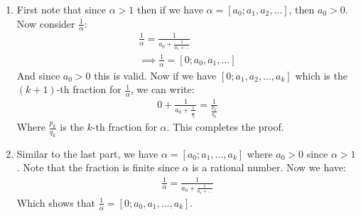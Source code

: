 \begin{enumerate}[label=\ilabel]
    \item 
        First note that since $\alpha > 1$ then if we have $\alpha = [a_0; a_1, a_2, \dots]$, then $a_0 > 0$. Now consider $\frac{1}{\alpha}$:
        \begin{gather*}
            \frac{1}{\alpha} = \frac{1}{a_0 + \frac{1}{a_1 + \dots}} \\
            \implies \frac{1}{\alpha} = [0; a_0, a_1, \dots]
        \end{gather*}
        And since $a_0 > 0$ this is valid. Now if we have $[0; a_1, a_2, \dots, a_k]$ which is the $(k + 1)$-th fraction for $\frac{1}{\alpha}$, we can write:
        \begin{gather*}
            0 + \frac{1}{a_0 + \frac{1}{\frac{\vdots}{a_k}}} = \frac{1}{\frac{p_k}{q_k}}
        \end{gather*}
        Where $\frac{p_k}{q_k}$ is the $k$-th fraction for $\alpha$. This completes the proof.


    \item 
        Similar to the last part, we have $\alpha = [a_0; a_1, \dots, a_k]$ where $a_0 > 0$ since $\alpha > 1$. Note that the fraction is finite since $\alpha$ is a rational number. Now we have:
        \begin{gather*}
            \frac{1}{\alpha} = \frac{1}{a_0 + \frac{1}{a_1 + \dots}}
        \end{gather*}
        Which shows that $\frac{1}{\alpha} = [0; a_0, a_1, \dots, a_k]$.
\end{enumerate}